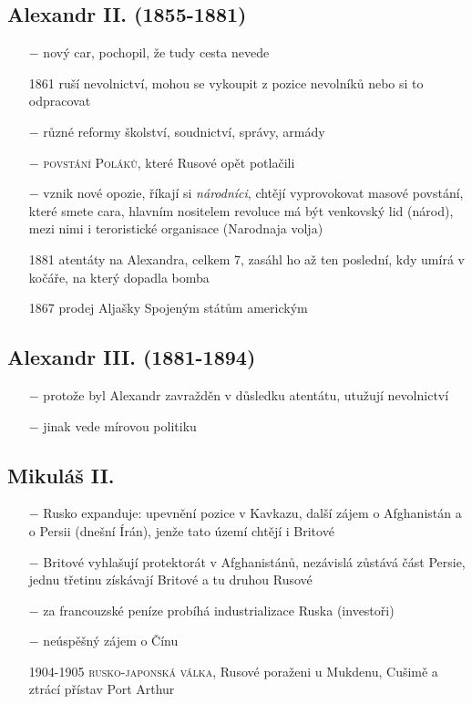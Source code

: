\documentclass{article}
\begin{document}
\subsection*{Alexandr II. (1855-1881)}
\begin{itemize}
    \vspace{-0.5em}
    \setlength\itemsep{0.15em}
    \item[$-$] nový car, pochopil, že tudy cesta nevede
    \item[1861] ruší nevolnictví, mohou se vykoupit z pozice nevolníků nebo si to odpracovat
    \item[$-$] různé reformy školství, soudnictví, správy, armády
    \item[$-$] \textsc{povstání Poláků}, které Rusové opět potlačili
    \item[$-$] vznik nové opozie, říkají si \textit{národníci}, chtějí vyprovokovat masové povstání, které smete cara, hlavním nositelem revoluce má být venkovský lid (národ), mezi nimi i teroristické organisace (Narodnaja volja)
    \item[1881] atentáty na Alexandra, celkem 7, zasáhl ho až ten poslední, kdy umírá v kočáře, na který dopadla bomba
    \item[1867] prodej Aljašky Spojeným státům americkým
\end{itemize}

\subsection*{Alexandr III. (1881-1894)}
\begin{itemize}
    \vspace{-0.5em}
    \setlength\itemsep{0.15em}
    \item[$-$] protože byl Alexandr zavražděn v důsledku atentátu, utužují nevolnictví
    \item[$-$] jinak vede mírovou politiku
\end{itemize}

\subsection*{Mikuláš II. }
\begin{itemize}
    \vspace{-0.5em}
    \setlength\itemsep{0.15em}
    \item[$-$] Rusko expanduje: upevnění pozice v Kavkazu, další zájem o Afghanistán a o Persii (dnešní Írán), jenže tato území chtějí i Britové
    \item[$-$] Britové vyhlašují protektorát v Afghanistánů, nezávislá zůstává část Persie, jednu třetinu získávají Britové a tu druhou Rusové
    \item[$-$] za francouzské peníze probíhá industrializace Ruska (investoři)
    \item[$-$] neúspěšný zájem o Čínu
    \item[1904-1905] \textsc{rusko-japonská válka}, Rusové poraženi u Mukdenu, Cušimě a ztrácí přístav Port Arthur
\end{itemize}
\end{document}
